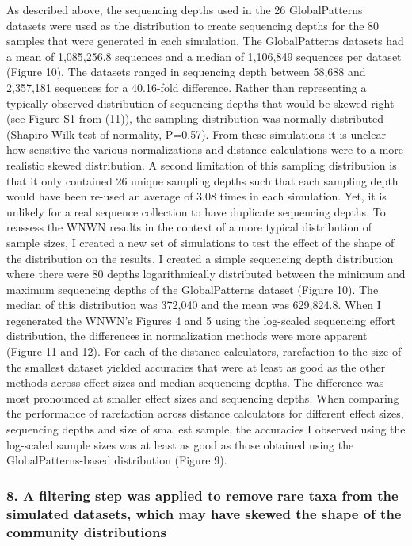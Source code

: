 \documentclass[
]{article}
\begin{document}
As described above, the sequencing depths used in the 26 GlobalPatterns
datasets were used as the distribution to create sequencing depths for
the 80 samples that were generated in each simulation. The
GlobalPatterns datasets had a mean of 1,085,256.8 sequences and a median
of 1,106,849 sequences per dataset (Figure 10). The datasets ranged in
sequencing depth between 58,688 and 2,357,181 sequences for a 40.16-fold
difference. Rather than representing a typically observed distribution
of sequencing depths that would be skewed right (see Figure S1 from
(11)), the sampling distribution was normally distributed (Shapiro-Wilk
test of normality, P=0.57). From these simulations it is unclear how
sensitive the various normalizations and distance calculations were to a
more realistic skewed distribution. A second limitation of this sampling
distribution is that it only contained 26 unique sampling depths such
that each sampling depth would have been re-used an average of 3.08
times in each simulation. Yet, it is unlikely for a real sequence
collection to have duplicate sequencing depths. To reassess the WNWN
results in the context of a more typical distribution of sample sizes, I
created a new set of simulations to test the effect of the shape of the
distribution on the results. I created a simple sequencing depth
distribution where there were 80 depths logarithmically distributed
between the minimum and maximum sequencing depths of the GlobalPatterns
dataset (Figure 10). The median of this distribution was 372,040 and the
mean was 629,824.8. When I regenerated the WNWN's Figures 4 and 5 using
the log-scaled sequencing effort distribution, the differences in
normalization methods were more apparent (Figure 11 and 12). For each of
the distance calculators, rarefaction to the size of the smallest
dataset yielded accuracies that were at least as good as the other
methods across effect sizes and median sequencing depths. The difference
was most pronounced at smaller effect sizes and sequencing depths. When
comparing the performance of rarefaction across distance calculators for
different effect sizes, sequencing depths and size of smallest sample,
the accuracies I observed using the log-scaled sample sizes was at least
as good as those obtained using the GlobalPatterns-based distribution
(Figure 9).

\hypertarget{a-filtering-step-was-applied-to-remove-rare-taxa-from-the-simulated-datasets-which-may-have-skewed-the-shape-of-the-community-distributions}{%
\subsubsection{8. A filtering step was applied to remove rare taxa from
the simulated datasets, which may have skewed the shape of the community
distributions}\label{a-filtering-step-was-applied-to-remove-rare-taxa-from-the-simulated-datasets-which-may-have-skewed-the-shape-of-the-community-distributions}}
\end{document}
